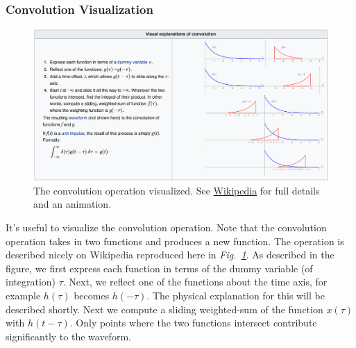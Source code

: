 \subsubsection{Convolution Visualization}
\begin{figure}[tb]
\centering
\includegraphics[width=\columnwidth]{conv_picture.png} 
\caption{The convolution operation visualized.  See \href{https://en.wikipedia.org/wiki/Convolution}{Wikipedia} for full details and an animation. }
\label{fig:conv_visual}
\end{figure}
It's useful to visualize the convolution operation.  Note that the convolution operation takes in two functions and produces a new function.  The operation is described nicely on Wikipedia reproduced here in \emph{Fig.~\ref{fig:conv_visual}}.  As described in the figure, we first express each function in terms of the dummy variable (of integration) $\tau$.  Next, we reflect one of the functions about the time axis, for example $h(\tau)$ becomes $h(-\tau)$.  The physical explanation for this will be described shortly.  Next we compute a sliding weighted-sum of the function $x(\tau)$ with $h(t-\tau)$.  Only points where the two functions intersect contribute significantly to the waveform.  
